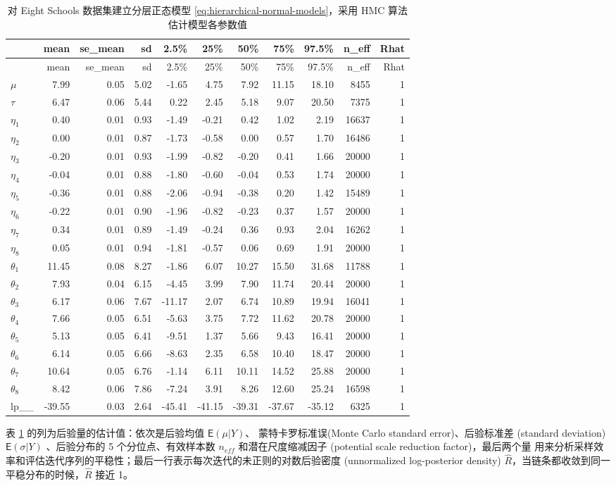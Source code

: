 \documentclass[12pt,a4paper,UTF8,twoside]{book}
\theoremstyle{definition}
\theoremstyle{definition}
\theoremstyle{definition}
\theoremstyle{remark}
\begin{document}
\begin{longtable}[]{@{}lrrrrrrrrrr@{}}
\caption{\label{tab:eight-schools-output} 对 Eight Schools
数据集建立分层正态模型 \eqref{eq:hierarchical-normal-models}，采用 HMC
算法估计模型各参数值}\tabularnewline
\toprule
& mean & se\_mean & sd & 2.5\% & 25\% & 50\% & 75\% & 97.5\% & n\_eff &
Rhat\tabularnewline
\midrule
\endfirsthead
\toprule
& mean & se\_mean & sd & 2.5\% & 25\% & 50\% & 75\% & 97.5\% & n\_eff &
Rhat\tabularnewline
\midrule
\endhead
\(\mu\) & 7.99 & 0.05 & 5.02 & -1.65 & 4.75 & 7.92 & 11.15 & 18.10 &
8455 & 1\tabularnewline
\(\tau\) & 6.47 & 0.06 & 5.44 & 0.22 & 2.45 & 5.18 & 9.07 & 20.50 & 7375
& 1\tabularnewline
\(\eta_1\) & 0.40 & 0.01 & 0.93 & -1.49 & -0.21 & 0.42 & 1.02 & 2.19 &
16637 & 1\tabularnewline
\(\eta_2\) & 0.00 & 0.01 & 0.87 & -1.73 & -0.58 & 0.00 & 0.57 & 1.70 &
16486 & 1\tabularnewline
\(\eta_3\) & -0.20 & 0.01 & 0.93 & -1.99 & -0.82 & -0.20 & 0.41 & 1.66 &
20000 & 1\tabularnewline
\(\eta_4\) & -0.04 & 0.01 & 0.88 & -1.80 & -0.60 & -0.04 & 0.53 & 1.74 &
20000 & 1\tabularnewline
\(\eta_5\) & -0.36 & 0.01 & 0.88 & -2.06 & -0.94 & -0.38 & 0.20 & 1.42 &
15489 & 1\tabularnewline
\(\eta_6\) & -0.22 & 0.01 & 0.90 & -1.96 & -0.82 & -0.23 & 0.37 & 1.57 &
20000 & 1\tabularnewline
\(\eta_7\) & 0.34 & 0.01 & 0.89 & -1.49 & -0.24 & 0.36 & 0.93 & 2.04 &
16262 & 1\tabularnewline
\(\eta_8\) & 0.05 & 0.01 & 0.94 & -1.81 & -0.57 & 0.06 & 0.69 & 1.91 &
20000 & 1\tabularnewline
\(\theta_1\) & 11.45 & 0.08 & 8.27 & -1.86 & 6.07 & 10.27 & 15.50 &
31.68 & 11788 & 1\tabularnewline
\(\theta_2\) & 7.93 & 0.04 & 6.15 & -4.45 & 3.99 & 7.90 & 11.74 & 20.44
& 20000 & 1\tabularnewline
\(\theta_3\) & 6.17 & 0.06 & 7.67 & -11.17 & 2.07 & 6.74 & 10.89 & 19.94
& 16041 & 1\tabularnewline
\(\theta_4\) & 7.66 & 0.05 & 6.51 & -5.63 & 3.75 & 7.72 & 11.62 & 20.78
& 20000 & 1\tabularnewline
\(\theta_5\) & 5.13 & 0.05 & 6.41 & -9.51 & 1.37 & 5.66 & 9.43 & 16.41 &
20000 & 1\tabularnewline
\(\theta_6\) & 6.14 & 0.05 & 6.66 & -8.63 & 2.35 & 6.58 & 10.40 & 18.47
& 20000 & 1\tabularnewline
\(\theta_7\) & 10.64 & 0.05 & 6.76 & -1.14 & 6.11 & 10.11 & 14.52 &
25.88 & 20000 & 1\tabularnewline
\(\theta_8\) & 8.42 & 0.06 & 7.86 & -7.24 & 3.91 & 8.26 & 12.60 & 25.24
& 16598 & 1\tabularnewline
lp\_\_ & -39.55 & 0.03 & 2.64 & -45.41 & -41.15 & -39.31 & -37.67 &
-35.12 & 6325 & 1\tabularnewline
\bottomrule
\end{longtable}

表 \ref{tab:eight-schools-output} 的列为后验量的估计值：依次是后验均值
\(\mathsf{E}(\mu|Y)\)、 蒙特卡罗标准误(Monte Carlo standard
error)、后验标准差 (standard deviation) \(\mathsf{E}(\sigma|Y)\)
、后验分布的 5 个分位点、有效样本数 \(n_{eff}\) 和潜在尺度缩减因子
(potential scale reduction factor)，最后两个量
用来分析采样效率和评估迭代序列的平稳性；最后一行表示每次迭代的未正则的对数后验密度
(unnormalized log-posterior density)
\(\hat{R}\)，当链条都收敛到同一平稳分布的时候，\(\hat{R}\) 接近 1。
\end{document}
